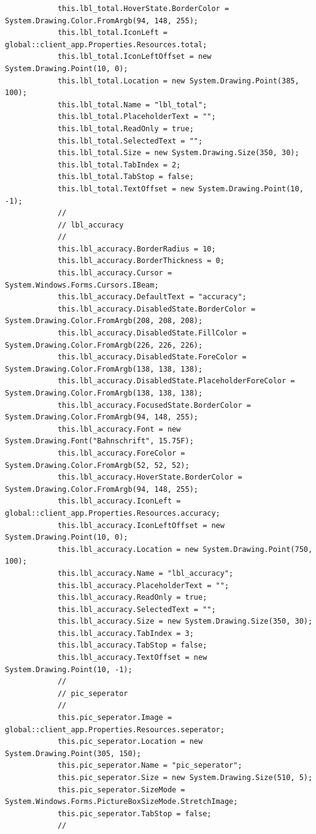 \documentclass{article}
\begin{document}
\begin{verbatim}
			this.lbl_total.HoverState.BorderColor = System.Drawing.Color.FromArgb(94, 148, 255);
			this.lbl_total.IconLeft = global::client_app.Properties.Resources.total;
			this.lbl_total.IconLeftOffset = new System.Drawing.Point(10, 0);
			this.lbl_total.Location = new System.Drawing.Point(385, 100);
			this.lbl_total.Name = "lbl_total";
			this.lbl_total.PlaceholderText = "";
			this.lbl_total.ReadOnly = true;
			this.lbl_total.SelectedText = "";
			this.lbl_total.Size = new System.Drawing.Size(350, 30);
			this.lbl_total.TabIndex = 2;
			this.lbl_total.TabStop = false;
			this.lbl_total.TextOffset = new System.Drawing.Point(10, -1);
			// 
			// lbl_accuracy
			// 
			this.lbl_accuracy.BorderRadius = 10;
			this.lbl_accuracy.BorderThickness = 0;
			this.lbl_accuracy.Cursor = System.Windows.Forms.Cursors.IBeam;
			this.lbl_accuracy.DefaultText = "accuracy";
			this.lbl_accuracy.DisabledState.BorderColor = System.Drawing.Color.FromArgb(208, 208, 208);
			this.lbl_accuracy.DisabledState.FillColor = System.Drawing.Color.FromArgb(226, 226, 226);
			this.lbl_accuracy.DisabledState.ForeColor = System.Drawing.Color.FromArgb(138, 138, 138);
			this.lbl_accuracy.DisabledState.PlaceholderForeColor = System.Drawing.Color.FromArgb(138, 138, 138);
			this.lbl_accuracy.FocusedState.BorderColor = System.Drawing.Color.FromArgb(94, 148, 255);
			this.lbl_accuracy.Font = new System.Drawing.Font("Bahnschrift", 15.75F);
			this.lbl_accuracy.ForeColor = System.Drawing.Color.FromArgb(52, 52, 52);
			this.lbl_accuracy.HoverState.BorderColor = System.Drawing.Color.FromArgb(94, 148, 255);
			this.lbl_accuracy.IconLeft = global::client_app.Properties.Resources.accuracy;
			this.lbl_accuracy.IconLeftOffset = new System.Drawing.Point(10, 0);
			this.lbl_accuracy.Location = new System.Drawing.Point(750, 100);
			this.lbl_accuracy.Name = "lbl_accuracy";
			this.lbl_accuracy.PlaceholderText = "";
			this.lbl_accuracy.ReadOnly = true;
			this.lbl_accuracy.SelectedText = "";
			this.lbl_accuracy.Size = new System.Drawing.Size(350, 30);
			this.lbl_accuracy.TabIndex = 3;
			this.lbl_accuracy.TabStop = false;
			this.lbl_accuracy.TextOffset = new System.Drawing.Point(10, -1);
			// 
			// pic_seperator
			// 
			this.pic_seperator.Image = global::client_app.Properties.Resources.seperator;
			this.pic_seperator.Location = new System.Drawing.Point(305, 150);
			this.pic_seperator.Name = "pic_seperator";
			this.pic_seperator.Size = new System.Drawing.Size(510, 5);
			this.pic_seperator.SizeMode = System.Windows.Forms.PictureBoxSizeMode.StretchImage;
			this.pic_seperator.TabStop = false;
			// 

\end{verbatim}
\end{document}
